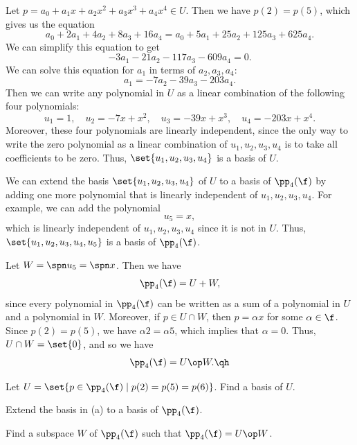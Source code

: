 \begin{sole}
    \item Let $p = a_0 + a_1 x + a_2 x^2 + a_3 x^3 + a_4 x^4 \in U$. Then we have $p(2) = p(5)$, which gives us the equation
    \[a_0 + 2a_1 + 4a_2 + 8a_3 + 16a_4 = a_0 + 5a_1 + 25a_2 + 125a_3 + 625a_4.\]
    We can simplify this equation to get
    \[-3a_1 - 21a_2 - 117a_3 - 609a_4 = 0.\]
    We can solve this equation for $a_1$ in terms of $a_2, a_3, a_4$:
    \[a_1 = -7a_2 - 39a_3 - 203a_4.\]
    Then we can write any polynomial in $U$ as a linear combination of the following four polynomials:
    \[u_1 = 1, \quad u_2 = -7x + x^2, \quad u_3 = -39x + x^3, \quad u_4 = -203x + x^4.\]
    Moreover, these four polynomials are linearly independent, since the only way to write the zero polynomial as a linear combination of $u_1, u_2, u_3, u_4$ is to take all coefficients to be zero. Thus, $\set{u_1, u_2, u_3, u_4}$ is a basis of $U$.
    \item We can extend the basis $\set{u_1, u_2, u_3, u_4}$ of $U$ to a basis of $\pp_4(\f)$ by adding one more polynomial that is linearly independent of $u_1, u_2, u_3, u_4$. For example, we can add the polynomial
    \[u_5 = x,\]
    which is linearly independent of $u_1, u_2, u_3, u_4$ since it is not in $U$. Thus, $\set{u_1, u_2, u_3, u_4, u_5}$ is a basis of $\pp_4(\f)$.
    \item Let $W = \spn u_5 = \spn x$. Then we have
    \[\pp_4(\f) = U + W,\]
    since every polynomial in $\pp_4(\f)$ can be written as a sum of a polynomial in $U$ and a polynomial in $W$. Moreover, if $p \in U \cap W$, then $p = \alpha x$ for some $\alpha \in \f$. Since $p(2) = p(5)$, we have $\alpha 2 = \alpha 5$, which implies that $\alpha = 0$. Thus, $U \cap W = \set{0}$, and so we have
    \[\pp_4(\f) = U \op W. \qh\]
\end{sole}

\begin{exercise}[2c6]
    \begin{subexercises}
        \item Let $U = \set{p \in \pp_4(\f) \mid p(2) = p(5) = p(6)}$. Find a basis of $U$.
        \item Extend the basis in (a) to a basis of $\pp_4(\f)$.
        \item Find a subspace $W$ of $\pp_4(\f)$ such that $\pp_4(\f) = U \op W$.
    \end{subexercises}
\end{exercise}

